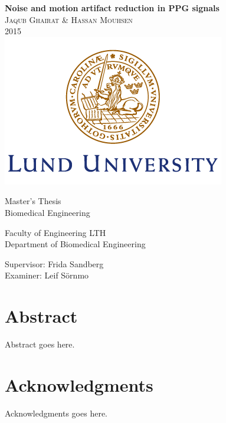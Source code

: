 \documentclass{report}
\begin{document}
\begin{titlepage}
    \begin{center}
       
        \textbf{\huge Noise and motion artifact reduction in PPG signals}
\\
\vspace{1cm}
\large \textsc{Jaqub Ghairat \& Hassan Mouhsen}
\\
\vspace{0.5cm}
2015
\\
\vspace{1cm}
\includegraphics[width=.4\textwidth]{lundlogo.png}


\vspace{1cm}
\LARGE Master's Thesis
\\
\LARGE Biomedical Engineering

\vspace{1.5cm}

\large Faculty of Engineering LTH 
\\
Department of Biomedical Engineering

\vspace{1cm}
Supervisor: Frida Sandberg
\\
\vspace{0.2cm}
Examiner: Leif Sörnmo

    \end{center}
\end{titlepage}




\newpage
\section*{\Huge{Abstract}}
Abstract goes here.
\setcounter{page}{2}
\thispagestyle{plain}

\newpage
\section*{\Huge{Acknowledgments}}
Acknowledgments goes here.
\thispagestyle{plain}
\end{document}
